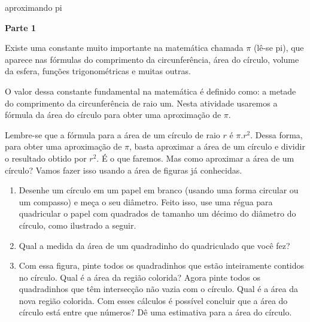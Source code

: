 \begin{task}{aproximando pi}



\textbf{Parte 1}

Existe uma constante muito importante na matemática chamada  \(\pi\) (lê-se pi), que aparece nas fórmulas do comprimento da circunferência, área do círculo, volume da esfera, funções trigonométricas e muitas outras.

O valor dessa constante fundamental na matemática é definido como: a metade do comprimento da circunferência de raio um. Nesta atividade usaremos a fórmula da área do círculo para obter uma aproximação de \(\pi\).

Lembre-se que a fórmula para a área de um círculo de raio \(r\) é  \(\pi.r^2\). Dessa forma, para obter uma aproximação de \(\pi\), basta aproximar a área de um círculo e dividir o resultado obtido por \(r^2\). É o que faremos. Mas como aproximar a área de um círculo? Vamos fazer isso usando a área de figuras já conhecidas.
\begin{enumerate}
\item {} 
Desenhe um círculo em um papel em branco (usando uma forma circular ou um compasso) e meça o seu diâmetro. Feito isso, use uma régua para quadricular o papel com quadrados de tamanho um décimo do diâmetro do círculo, como ilustrado a seguir.

\begin{figure}[H]
\centering

\end{figure}

\item {} 
Qual a medida da área de um quadradinho do quadriculado que você fez?

\item {} 
Com essa figura, pinte todos os quadradinhos que estão inteiramente contidos no círculo. Qual é a área da região colorida? Agora pinte todos os quadradinhos que têm intersecção não vazia com o círculo. Qual é a área da nova região colorida. Com esses cálculos é possível concluir que a área do círculo está entre que números? Dê uma estimativa para a área do círculo.


\end{enumerate}
\end{task}

